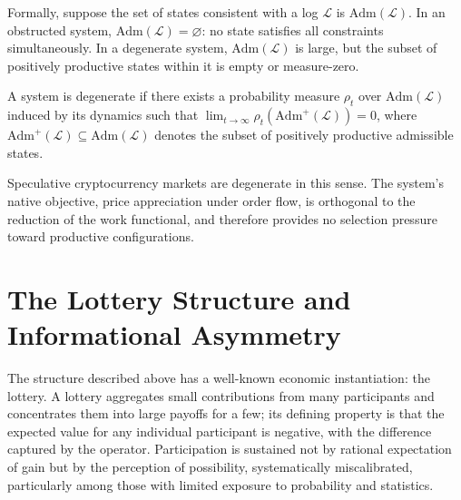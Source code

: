 Formally, suppose the set of states consistent with a log $\mathcal{L}$ is $\mathrm{Adm}(\mathcal{L})$. In an obstructed system, $\mathrm{Adm}(\mathcal{L}) = \varnothing$: no state satisfies all constraints simultaneously. In a degenerate system, $\mathrm{Adm}(\mathcal{L})$ is large, but the subset of positively productive states within it is empty or measure-zero.

\begin{proposition}
A system is degenerate if there exists a probability measure $\rho_t$ over $\mathrm{Adm}(\mathcal{L})$ induced by its dynamics such that $\lim_{t\to\infty} \rho_t(\mathrm{Adm}^+(\mathcal{L})) = 0$, where $\mathrm{Adm}^+(\mathcal{L}) \subseteq \mathrm{Adm}(\mathcal{L})$ denotes the subset of positively productive admissible states.
\end{proposition}

Speculative cryptocurrency markets are degenerate in this sense. The system's native objective, price appreciation under order flow, is orthogonal to the reduction of the work functional, and therefore provides no selection pressure toward productive configurations.

\section{The Lottery Structure and Informational Asymmetry}

The structure described above has a well-known economic instantiation: the lottery. A lottery aggregates small contributions from many participants and concentrates them into large payoffs for a few; its defining property is that the expected value for any individual participant is negative, with the difference captured by the operator. Participation is sustained not by rational expectation of gain but by the perception of possibility, systematically miscalibrated, particularly among those with limited exposure to probability and statistics.

